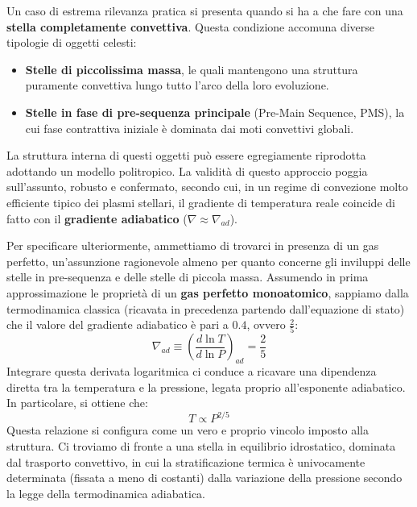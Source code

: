 Un caso di estrema rilevanza pratica si presenta quando si ha a che fare con una \textbf{stella completamente convettiva}. Questa condizione accomuna diverse tipologie di oggetti celesti:
\begin{itemize}
\item \textbf{Stelle di piccolissima massa}, le quali mantengono una struttura puramente convettiva lungo tutto l'arco della loro evoluzione.
\item \textbf{Stelle in fase di pre-sequenza principale} (Pre-Main Sequence, PMS), la cui fase contrattiva iniziale è dominata dai moti convettivi globali.
\end{itemize}
La struttura interna di questi oggetti può essere egregiamente riprodotta adottando un modello politropico. La validità di questo approccio poggia sull'assunto, robusto e confermato, secondo cui, in un regime di convezione molto efficiente tipico dei plasmi stellari, il gradiente di temperatura reale coincide di fatto con il \textbf{gradiente adiabatico} ($\nabla \approx \nabla_{ad}$).

Per specificare ulteriormente, ammettiamo di trovarci in presenza di un gas perfetto, un'assunzione ragionevole almeno per quanto concerne gli inviluppi delle stelle in pre-sequenza e delle stelle di piccola massa. Assumendo in prima approssimazione le proprietà di un \textbf{gas perfetto monoatomico}, sappiamo dalla termodinamica classica (ricavata in precedenza partendo dall'equazione di stato) che il valore del gradiente adiabatico è pari a $0.4$, ovvero $\frac{2}{5}$:
\begin{equation}
\nabla_{ad} \equiv \left(\frac{d \ln T}{d \ln P}\right)_{ad} = \frac{2}{5}
\end{equation}
Integrare questa derivata logaritmica ci conduce a ricavare una dipendenza diretta tra la temperatura e la pressione, legata proprio all'esponente adiabatico. In particolare, si ottiene che:
\begin{equation}
T \propto P^{2/5}
\end{equation}
Questa relazione si configura come un vero e proprio vincolo imposto alla struttura. Ci troviamo di fronte a una stella in equilibrio idrostatico, dominata dal trasporto convettivo, in cui la stratificazione termica è univocamente determinata (fissata a meno di costanti) dalla variazione della pressione secondo la legge della termodinamica adiabatica.

